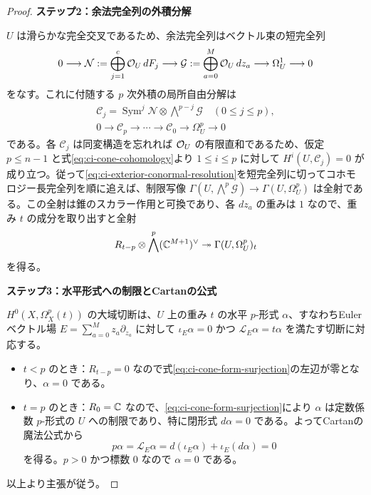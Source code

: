 \begin{proof}
\par\medskip\noindent\textbf{ステップ2：余法完全列の外積分解}\par\nobreak\smallskip
$U$ は滑らかな完全交叉であるため、余法完全列はベクトル束の短完全列
\begin{equation}
0\longrightarrow\mathcal N:=\bigoplus_{j=1}^c\mathcal O_U\,dF_j
\longrightarrow\mathcal G:=\bigoplus_{a=0}^{M}\mathcal O_U\,dz_a
\longrightarrow\Omega_U^1\longrightarrow0
\label{eq:ci-conormal-sequence}
\end{equation}
をなす。これに付随する $p$ 次外積の局所自由分解は
\begin{equation}
\begin{gathered}
\mathcal C_j=\operatorname{Sym}^j\mathcal N
        \otimes\bigwedge^{p-j}\mathcal G\quad(0\le j\le p),\\
0\longrightarrow\mathcal C_p\longrightarrow\cdots
\longrightarrow\mathcal C_0\longrightarrow\Omega_U^p\longrightarrow0
\end{gathered}
\label{eq:ci-exterior-conormal-resolution}
\end{equation}
である。各 $\mathcal C_j$ は同変構造を忘れれば $\mathcal O_U$ の有限直和であるため、仮定 $p\le n-1$ と式\eqref{eq:ci-cone-cohomology}より $1\le i\le p$ に対して $H^i(U,\mathcal C_j)=0$ が成り立つ。従って\eqref{eq:ci-exterior-conormal-resolution}を短完全列に切ってコホモロジー長完全列を順に追えば、制限写像 $\Gamma(U,\bigwedge^p\mathcal G)\to\Gamma(U,\Omega_U^p)$ は全射である。この全射は錐のスカラー作用と可換であり、各 $dz_a$ の重みは $1$ なので、重み $t$ の成分を取り出すと全射
\begin{equation}
R_{t-p}\otimes\bigwedge^p(\mathbb C^{M+1})^{\vee}
\twoheadrightarrow\Gamma(U,\Omega_U^p)_t
\label{eq:ci-cone-form-surjection}
\end{equation}
を得る。

\par\medskip\noindent\textbf{ステップ3：水平形式への制限とCartanの公式}\par\nobreak\smallskip
$H^0(X,\Omega_X^p(t))$ の大域切断は、$U$ 上の重み $t$ の水平 $p$-形式 $\alpha$、すなわちEulerベクトル場 $E=\sum_{a=0}^M z_a\partial_{z_a}$ に対して $\iota_E\alpha=0$ かつ $\mathcal L_E\alpha=t\alpha$ を満たす切断に対応する。
\begin{itemize}
  \item $t<p$ のとき：$R_{t-p}=0$ なので式\eqref{eq:ci-cone-form-surjection}の左辺が零となり、$\alpha=0$ である。
  \item $t=p$ のとき：$R_0=\mathbb C$ なので、\eqref{eq:ci-cone-form-surjection}により $\alpha$ は定数係数 $p$-形式の $U$ への制限であり、特に閉形式 $d\alpha=0$ である。よってCartanの魔法公式から
  \begin{equation}
    p\alpha=\mathcal L_E\alpha
    =d(\iota_E\alpha)+\iota_E(d\alpha)=0
    \label{eq:ci-cartan-vanishing}
  \end{equation}
  を得る。$p>0$ かつ標数 $0$ なので $\alpha=0$ である。
\end{itemize}
以上より主張が従う。
\end{proof}

